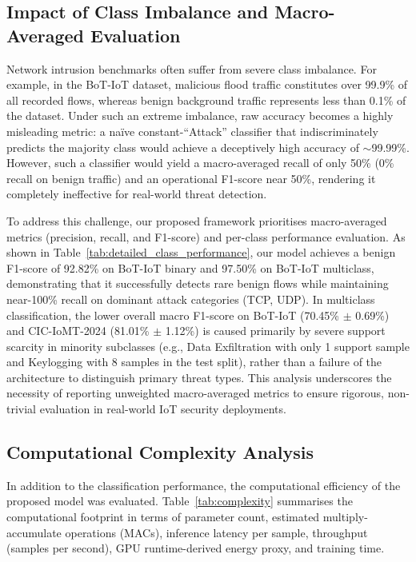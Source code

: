 \documentclass[a4paper,fleqn]{cas-sc}
\begin{document}
\subsection{Impact of Class Imbalance and Macro-Averaged Evaluation}

Network intrusion benchmarks often suffer from severe class imbalance. For example, in the BoT-IoT dataset, malicious flood traffic constitutes over 99.9\% of all recorded flows, whereas benign background traffic represents less than 0.1\% of the dataset. Under such an extreme imbalance, raw accuracy becomes a highly misleading metric: a na\"ive constant-``Attack'' classifier that indiscriminately predicts the majority class would achieve a deceptively high accuracy of $\sim$99.99\%. However, such a classifier would yield a macro-averaged recall of only 50\% (0\% recall on benign traffic) and an operational F1-score near 50\%, rendering it completely ineffective for real-world threat detection.

To address this challenge, our proposed framework prioritises macro-averaged metrics (precision, recall, and F1-score) and per-class performance evaluation. As shown in Table~\ref{tab:detailed_class_performance}, our model achieves a benign F1-score of 92.82\% on BoT-IoT binary and 97.50\% on BoT-IoT multiclass, demonstrating that it successfully detects rare benign flows while maintaining near-100\% recall on dominant attack categories (TCP, UDP). In multiclass classification, the lower overall macro F1-score on BoT-IoT (70.45\% $\pm$ 0.69\%) and CIC-IoMT-2024 (81.01\% $\pm$ 1.12\%) is caused primarily by severe support scarcity in minority subclasses (e.g., Data Exfiltration with only 1 support sample and Keylogging with 8 samples in the test split), rather than a failure of the architecture to distinguish primary threat types. This analysis underscores the necessity of reporting unweighted macro-averaged metrics to ensure rigorous, non-trivial evaluation in real-world IoT security deployments.


\subsection{Computational Complexity Analysis}

In addition to the classification performance, the computational efficiency of the proposed model was evaluated. Table~\ref{tab:complexity} summarises the computational footprint in terms of parameter count, estimated multiply-accumulate operations (MACs), inference latency per sample, throughput (samples per second), GPU runtime-derived energy proxy, and training time.
\end{document}
